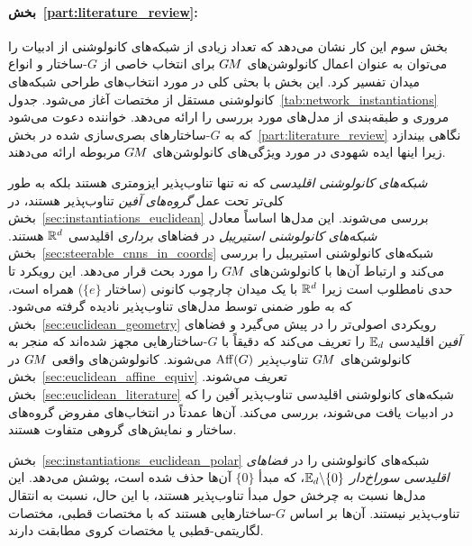 \paragraph{بخش~\ref{part:literature_review}:}

بخش سوم این کار نشان می‌دهد که تعداد زیادی از شبکه‌های کانولوشنی از ادبیات را می‌توان به عنوان اعمال کانولوشن‌های $G\mkern-1.4muM$ برای انتخاب خاصی از $G$-ساختار و انواع میدان تفسیر کرد.
این بخش با بحثی کلی در مورد انتخاب‌های طراحی شبکه‌های کانولوشنی مستقل از مختصات آغاز می‌شود.
جدول~\ref{tab:network_instantiations} مروری و طبقه‌بندی از مدل‌های مورد بررسی را ارائه می‌دهد.
خواننده دعوت می‌شود که به $G$-ساختارهای بصری‌سازی شده در بخش~\ref{part:literature_review} نگاهی بیندازد زیرا اینها ایده شهودی در مورد ویژگی‌های کانولوشن‌های $G\mkern-1.4muM$ مربوطه ارائه می‌دهند.

\emph{شبکه‌های کانولوشنی اقلیدسی} که نه تنها تناوب‌پذیر ایزومتری هستند بلکه به طور کلی‌تر تحت عمل \emph{گروه‌های آفین} تناوب‌پذیر هستند، در بخش~\ref{sec:instantiations_euclidean} بررسی می‌شوند.
این مدل‌ها اساساً معادل \emph{شبکه‌های کانولوشنی استیریبل} در فضاهای \emph{برداری} اقلیدسی $\mathbb{R}^d$ \cite{Cohen2017-STEER,3d_steerableCNNs,Weiler2019_E2CNN} هستند.
بخش~\ref{sec:steerable_cnns_in_coords} شبکه‌های کانولوشنی استیریبل را بررسی می‌کند و ارتباط آن‌ها با کانولوشن‌های $G\mkern-1.4muM$ را مورد بحث قرار می‌دهد.
این رویکرد تا حدی نامطلوب است زیرا $\mathbb{R}^d$ با یک میدان چارچوب کانونی (ساختار $\{e\}$) همراه است، که به طور ضمنی توسط مدل‌های تناوب‌پذیر نادیده گرفته می‌شود.
بخش~\ref{sec:euclidean_geometry} رویکردی اصولی‌تر را در پیش می‌گیرد و فضاهای \emph{آفین} اقلیدسی $\mathbb{E}_d$ را تعریف می‌کند که دقیقاً با $G$-ساختارهایی مجهز شده‌اند که منجر به کانولوشن‌های $G\mkern-1.4muM$ تناوب‌پذیر $\operatorname{Aff}(G)$ می‌شوند.
کانولوشن‌های واقعی $G\mkern-1.4muM$ در بخش~\ref{sec:euclidean_affine_equiv} تعریف می‌شوند.
بخش~\ref{sec:euclidean_literature} شبکه‌های کانولوشنی اقلیدسی تناوب‌پذیر آفین را که در ادبیات یافت می‌شوند، بررسی می‌کند.
آن‌ها عمدتاً در انتخاب‌های مفروض گروه‌های ساختار و نمایش‌های گروهی متفاوت هستند.

بخش~\ref{sec:instantiations_euclidean_polar} شبکه‌های کانولوشنی را در \emph{فضاهای اقلیدسی سوراخ‌دار} $\mathbb{E}_d\backslash\{0\}$، که مبدأ $\{0\}$ آن‌ها حذف شده است، پوشش می‌دهد.
این مدل‌ها نسبت به چرخش حول مبدأ تناوب‌پذیر هستند، با این حال، نسبت به انتقال تناوب‌پذیر نیستند.
آن‌ها بر اساس $G$-ساختارهایی هستند که با مختصات قطبی، مختصات لگاریتمی-قطبی یا مختصات کروی مطابقت دارند.


